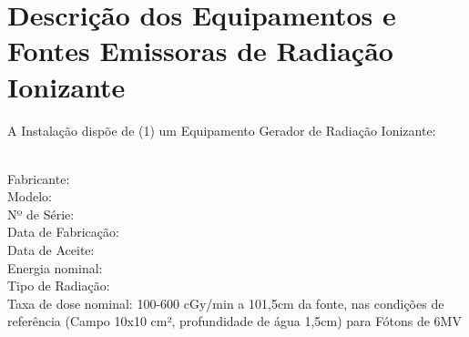 \chapter{Descrição dos Equipamentos e Fontes Emissoras de Radiação Ionizante}
\label{ch:descricao_equipamentos_fontes-emissoras}
A Instalação dispõe de (1) um Equipamento Gerador de Radiação Ionizante:

\begingroup
    \noindent {}\\
    Fabricante: \\
    Modelo: \\
    Nº de Série:  \\
    Data de Fabricação: \COLORtextbf{****}\\
    Data de Aceite: \COLORtextbf{****}\\
    Energia nominal: \COLORtextbf{****}\\
    Tipo de Radiação: \COLORtextbf{****}\\
    Taxa de dose nominal: 100-600 cGy/min a 101,5cm da fonte, nas condições de referência (Campo 10x10 cm², 	profundidade de água 1,5cm) para Fótons de 6MV
\endgroup


\vfill